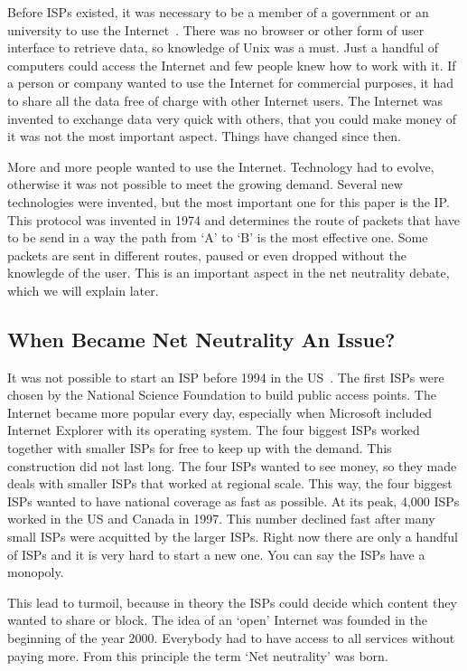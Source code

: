 Before \acp{ISP} existed, it was necessary to be a member of a government or an university to use the Internet~\cite{historyisp}. There was no browser or other form of user interface to retrieve data, so knowledge of Unix was a must. Just a handful of computers could access the Internet and few people knew how to work with it. If a person or company wanted to use the Internet for commercial purposes, it had to share all the data free of charge with other Internet users. The Internet was invented to exchange data very quick with others, that you could make money of it was not the most important aspect. Things have changed since then.

More and more people wanted to use the Internet. Technology had to evolve, otherwise it was not possible to meet the growing demand. Several new technologies were invented, but the most important one for this paper is the \acf{IP}. This protocol was invented in 1974 and determines the route of packets that have to be send in a way the path from `A' to `B' is the most effective one. Some packets are sent in different routes, paused or even dropped without the knowlegde of the user. This is an important aspect in the net neutrality debate, which we will explain later.

\subsection{When Became Net Neutrality An Issue?}
It was not possible to start an \ac{ISP} before 1994 in the US~\cite{historyisp}. The first \acp{ISP} were chosen by the National Science Foundation to build public access points. The Internet became more popular every day, especially when Microsoft included Internet Explorer with its operating system. The four biggest \acp{ISP} worked together with smaller \acp{ISP} for free to keep up with the demand. This construction did not last long. The four \acp{ISP} wanted to see money, so they made deals with smaller \acp{ISP} that worked at regional scale. This way, the four biggest \acp{ISP} wanted to have national coverage as fast as possible. At its peak, 4,000 \acp{ISP} worked in the US and Canada in 1997. This number declined fast after many small \acp{ISP} were acquitted by the larger \acp{ISP}. Right now there are only a handful of \acp{ISP} and it is very hard to start a new one. You can say the \acp{ISP} have a monopoly.

This lead to turmoil, because in theory the \acp{ISP} could decide which content they wanted to share or block. The idea of an `open' Internet was founded in the beginning of the year 2000. Everybody had to have access to all services without paying more. From this principle the term `Net neutrality' was born.